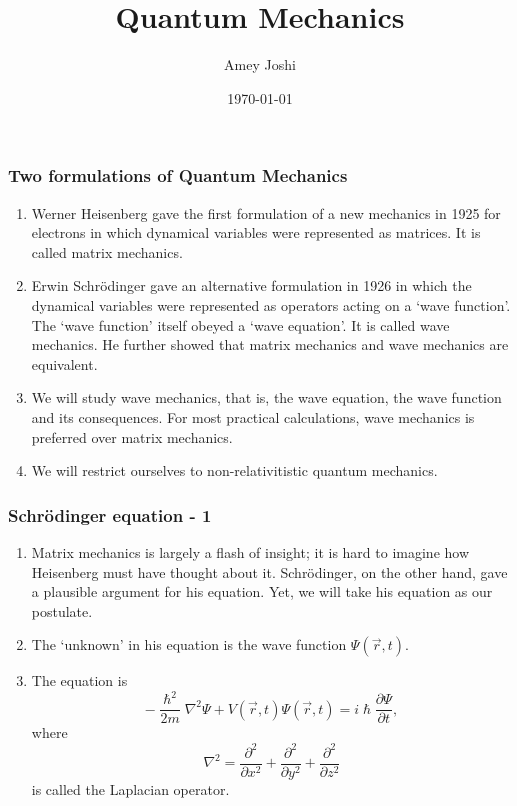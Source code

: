 \documentclass{beamer}
\title{Quantum Mechanics}
\author{Amey Joshi}
\date{\today}
\begin{document}
\begin{frame}
\titlepage
\end{frame}

\begin{frame}
\frametitle{Two formulations of Quantum Mechanics}
\begin{enumerate}
\item Werner Heisenberg gave the first formulation of a new mechanics in 1925 
for electrons in which dynamical variables were represented as matrices. It is 
called matrix mechanics.
\item Erwin Schr\"{o}dinger gave an alternative formulation in 1926 in which
the dynamical variables were represented as operators acting on a `wave 
function'. The `wave function' itself obeyed a `wave equation'. It is called
wave mechanics. He further showed that matrix mechanics and wave mechanics are
equivalent.
\item We will study wave mechanics, that is, the wave equation, the wave 
function and its consequences. For most practical calculations, wave mechanics
is preferred over matrix mechanics.
\item We will restrict ourselves to non-relativitistic quantum mechanics.
\end{enumerate}
\end{frame}

\begin{frame}
\frametitle{Schr\"{o}dinger equation - 1}
\begin{enumerate}
\item Matrix mechanics is largely a flash of insight; it is hard to imagine how
Heisenberg must have thought about it. Schr\"{o}dinger, on the other hand, gave
a plausible argument for his equation. Yet, we will take his equation as our
postulate.
\item The `unknown' in his equation is the wave function $\Psi(\vec{r}, t)$.
\item The equation is
\begin{equation}\label{e1}
-\frac{\hslash^2}{2m}\nabla^2\Psi + V(\vec{r},t)\Psi(\vec{r}, t) = 
i\hslash\frac{\partial\Psi}{\partial t},
\end{equation}
where
\begin{equation}\label{e2}
\nabla^2 = \frac{\partial^2}{\partial x^2} + \frac{\partial^2}{\partial y^2} + 
\frac{\partial^2}{\partial z^2} 
\end{equation}
is called the Laplacian operator.
\end{enumerate}
\end{frame}
\end{document}
